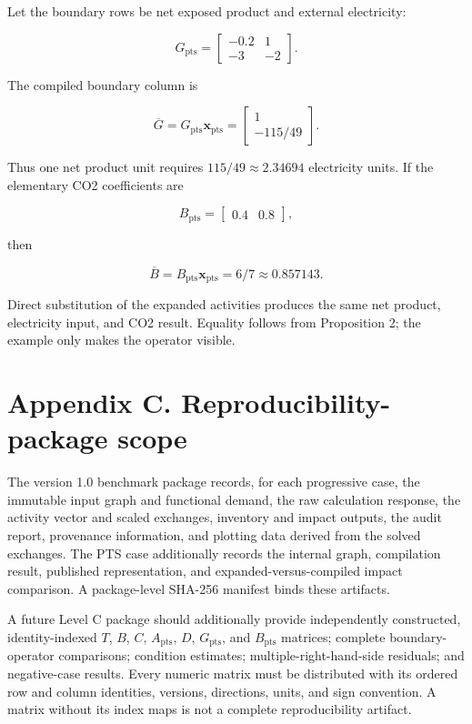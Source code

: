 \documentclass[
  10pt,
  a4paper,
  DIV=11,
  numbers=noendperiod]{scrartcl}
\begin{document}
Let the boundary rows be net exposed product and external electricity:

\[
G_{\mathrm{pts}}=
\begin{bmatrix}
-0.2 & 1\\
-3 & -2
\end{bmatrix}.
\]

The compiled boundary column is

\[
\overline G=G_{\mathrm{pts}}\mathbf x_{\mathrm{pts}}
=
\begin{bmatrix}
1\\-115/49
\end{bmatrix}.
\]

Thus one net product unit requires \(115/49\approx2.34694\) electricity
units. If the elementary CO2 coefficients are

\[
B_{\mathrm{pts}}=
\begin{bmatrix}
0.4 & 0.8
\end{bmatrix},
\]

then

\[
\overline B=B_{\mathrm{pts}}\mathbf x_{\mathrm{pts}}
=6/7\approx0.857143.
\]

Direct substitution of the expanded activities produces the same net
product, electricity input, and CO2 result. Equality follows from
Proposition 2; the example only makes the operator visible.

\section{Appendix C. Reproducibility-package
scope}\label{appendix-c.-reproducibility-package-scope}

The version 1.0 benchmark package records, for each progressive case,
the immutable input graph and functional demand, the raw calculation
response, the activity vector and scaled exchanges, inventory and impact
outputs, the audit report, provenance information, and plotting data
derived from the solved exchanges. The PTS case additionally records the
internal graph, compilation result, published representation, and
expanded-versus-compiled impact comparison. A package-level SHA-256
manifest binds these artifacts.

A future Level C package should additionally provide independently
constructed, identity-indexed \(T\), \(B\), \(C\), \(A_{\mathrm{pts}}\),
\(D\), \(G_{\mathrm{pts}}\), and \(B_{\mathrm{pts}}\) matrices; complete
boundary-operator comparisons; condition estimates;
multiple-right-hand-side residuals; and negative-case results. Every
numeric matrix must be distributed with its ordered row and column
identities, versions, directions, units, and sign convention. A matrix
without its index maps is not a complete reproducibility artifact.
\end{document}

